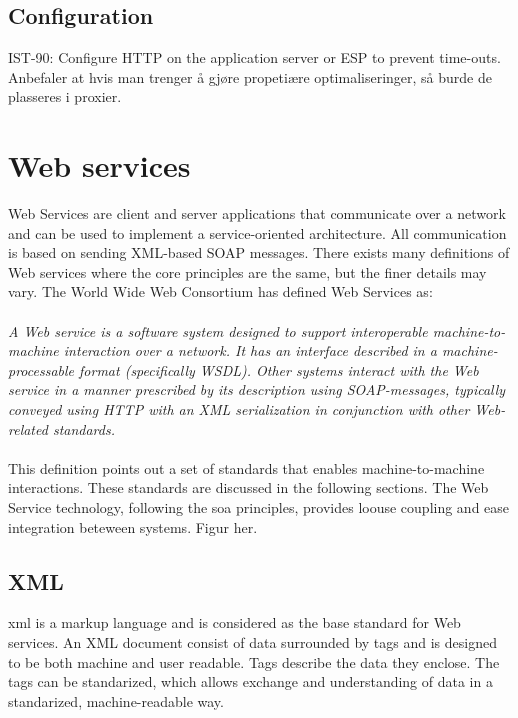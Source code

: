 \documentclass[USenglish]{ifimaster}
\begin{document}
\subsection{Configuration}
IST-90: Configure HTTP on the application server or ESP to prevent time-outs.
Anbefaler at hvis man trenger å gjøre propetiære optimaliseringer, så burde de
plasseres i proxier.


\section{Web services}
\label{web-services}
Web Services are client and server applications that communicate over a network
and can be used to implement a service-oriented architecture. All communication
is based on sending XML-based SOAP messages. There exists many definitions of
Web services where the core principles are the same, but the finer details may
vary. The World Wide Web Consortium has defined Web Services
as\cite{wrc-web-service}:
\paragraph{}
\textit{
    A Web service is a software system designed to support interoperable
    machine-to-machine interaction over a network. It has an interface described in
    a machine-processable format (specifically WSDL). Other systems interact with
    the Web service in a manner prescribed by its description using SOAP-messages,
    typically conveyed using HTTP with an XML serialization in conjunction with
    other Web-related standards.
}

\paragraph{}

This definition points out a set of standards that enables machine-to-machine
interactions. These standards are discussed in the following sections. The Web
Service technology, following the \gls{soa} principles, provides loouse coupling
and ease integration beteween systems. Figur her.


\subsection{XML}

\gls{xml} is a markup language and is considered as the base standard for Web
services. An XML document consist of data surrounded by tags and is designed to
be both machine and user readable. Tags describe the data they enclose. The tags
can be standarized, which allows exchange and understanding of data in a
standarized, machine-readable way.
\end{document}
